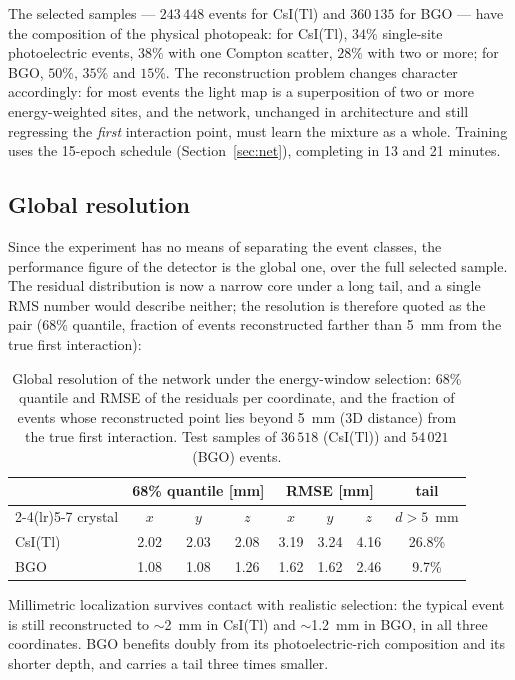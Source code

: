 \documentclass[11pt,a4paper]{article}
\newcommand{\csitl}{CsI(Tl)}
\begin{document}
The selected samples --- $243\,448$ events for \csitl{} and $360\,135$ for BGO
--- have the composition of the physical photopeak: for \csitl{}, $34\%$
single-site photoelectric events, $38\%$ with one Compton scatter, $28\%$ with
two or more; for BGO, $50\%$, $35\%$ and $15\%$. The reconstruction problem
changes character accordingly: for most events the light map is a superposition
of two or more energy-weighted sites, and the network, unchanged in
architecture and still regressing the \emph{first} interaction point, must
learn the mixture as a whole. Training uses the 15-epoch schedule
(Section~\ref{sec:net}), completing in 13 and 21 minutes.

\subsection{Global resolution}

Since the experiment has no means of separating the event classes, the
performance figure of the detector is the global one, over the full selected
sample. The residual distribution is now a narrow core under a long tail, and
a single RMS number would describe neither; the resolution is therefore quoted
as the pair (68\% quantile, fraction of events reconstructed farther than
5~mm from the true first interaction):

\begin{table}[htbp]
\centering
\begin{tabular}{lccccccc}
  \toprule
  & \multicolumn{3}{c}{68\% quantile [mm]} & \multicolumn{3}{c}{RMSE [mm]} &
  tail \\
  \cmidrule(lr){2-4}\cmidrule(lr){5-7}
  crystal & $x$ & $y$ & $z$ & $x$ & $y$ & $z$ & $d > 5$~mm \\
  \midrule
  \csitl{} & 2.02 & 2.03 & 2.08 & 3.19 & 3.24 & 4.16 & 26.8\% \\
  BGO      & 1.08 & 1.08 & 1.26 & 1.62 & 1.62 & 2.46 & 9.7\% \\
  \bottomrule
\end{tabular}
\caption{Global resolution of the network under the energy-window selection:
68\% quantile and RMSE of the residuals per coordinate, and the fraction of
events whose reconstructed point lies beyond 5~mm (3D distance) from the true
first interaction. Test samples of $36\,518$ (\csitl{}) and $54\,021$ (BGO)
events.}
\label{tab:window}
\end{table}

Millimetric localization survives contact with realistic selection: the
typical event is still reconstructed to $\sim$2~mm in \csitl{} and
$\sim$1.2~mm in BGO, in all three coordinates. BGO benefits doubly from its
photoelectric-rich composition and its shorter depth, and carries a tail three
times smaller.
\end{document}
